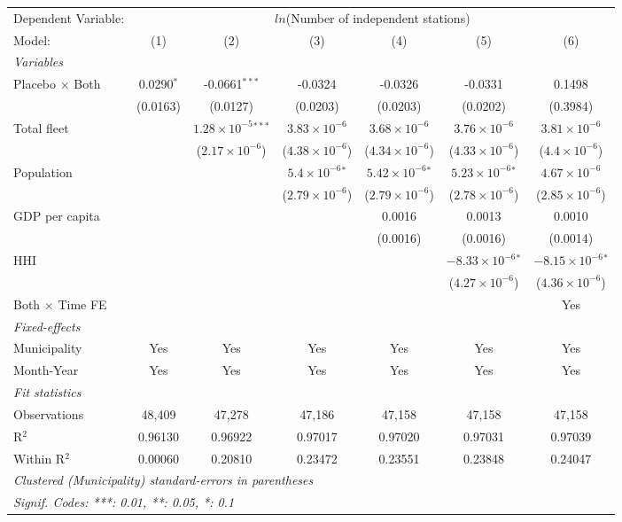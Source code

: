 \documentclass[
]{article}
\begin{document}
\begin{tabular}{lcccccc}
\tabularnewline\midrule\midrule
Dependent Variable:&\multicolumn{6}{c}{$ln$(Number of independent stations)}\\
Model:&(1) & (2) & (3) & (4) & (5) & (6)\\
\midrule \emph{Variables}&   &   &   &   &   &  \\
Placebo $\times $ Both & 0.0290$^{*}$ & -0.0661$^{***}$ & -0.0324 & -0.0326 & -0.0331 & 0.1498\\
  &(0.0163) & (0.0127) & (0.0203) & (0.0203) & (0.0202) & (0.3984)\\
Total fleet &    & $1.28\times 10^{-5}$$^{***}$ & $3.83\times 10^{-6}$ & $3.68\times 10^{-6}$ & $3.76\times 10^{-6}$ & $3.81\times 10^{-6}$\\
  &   & ($2.17\times 10^{-6}$) & ($4.38\times 10^{-6}$) & ($4.34\times 10^{-6}$) & ($4.33\times 10^{-6}$) & ($4.4\times 10^{-6}$)\\
Population &    &    & $5.4\times 10^{-6}$$^{*}$ & $5.42\times 10^{-6}$$^{*}$ & $5.23\times 10^{-6}$$^{*}$ & $4.67\times 10^{-6}$\\
  &   &    & ($2.79\times 10^{-6}$) & ($2.79\times 10^{-6}$) & ($2.78\times 10^{-6}$) & ($2.85\times 10^{-6}$)\\
GDP per capita &    &    &    & 0.0016 & 0.0013 & 0.0010\\
  &   &    &    & (0.0016) & (0.0016) & (0.0014)\\
HHI &    &    &    &    & $-8.33\times 10^{-6}$$^{*}$ & $-8.15\times 10^{-6}$$^{*}$\\
  &   &    &    &    & ($4.27\times 10^{-6}$) & ($4.36\times 10^{-6}$)\\
Both $\times$ Time FE &  &  &  &  &  & Yes\\
\midrule \emph{Fixed-effects}&   &   &   &   &   &  \\
Municipality & Yes & Yes & Yes & Yes & Yes & Yes\\
Month-Year & Yes & Yes & Yes & Yes & Yes & Yes\\
\midrule \emph{Fit statistics}&  & & & & & \\
Observations & 48,409&47,278&47,186&47,158&47,158&47,158\\
R$^2$ & 0.96130&0.96922&0.97017&0.97020&0.97031&0.97039\\
Within R$^2$ & 0.00060&0.20810&0.23472&0.23551&0.23848&0.24047\\
\midrule\midrule\multicolumn{7}{l}{\emph{Clustered (Municipality) standard-errors in parentheses}}\\
\multicolumn{7}{l}{\emph{Signif. Codes: ***: 0.01, **: 0.05, *: 0.1}}\\
\end{tabular}
\end{document}
